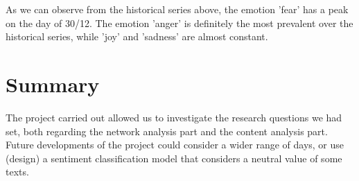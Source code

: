 \documentclass[12pt,journal,compsoc]{IEEEtran}
\begin{document}
As we can observe from the historical series above, the emotion 'fear' has a peak on the day of 30/12. The emotion 'anger' is definitely the most prevalent over the historical series, while 'joy' and 'sadness' are almost constant.

\section{Summary}
The project carried out allowed us to investigate the research questions we had set, both regarding the network analysis part and the content analysis part.\\
Future developments of the project could consider a wider range of days, or use (design) a sentiment classification model that considers a neutral value of some texts.


\nocite{*}
\printbibliography
\end{document}
